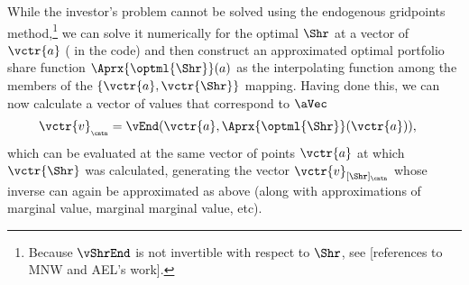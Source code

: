 While the investor's problem cannot be solved using the endogenous gridpoints method,\footnote{Because $\vShrEnd$ is not invertible with respect to $\Shr$, see [references to MNW and AEL's work].} we can solve it numerically for the optimal $\Shr$ at a vector of $\vctr{a}$ ({\aVecCode} in the code)  and then construct an approximated optimal portfolio share function $\Aprx{\optml{\Shr}}(a)$ as the interpolating function among the members of the $\{\vctr{a},\vctr{\Shr}\}$ mapping.  Having done this, we can now calculate a vector of values that correspond to $\aVec$
\begin{equation}\begin{gathered}\begin{aligned}
      \vctr{{v}}_{_\cntn}  & = \vEnd(\vctr{a},\Aprx{\optml{\Shr}}(\vctr{a})), \label{eq:vShrEnd}
    \end{aligned}\end{gathered}\end{equation}
which can be evaluated at the same vector of points $\vctr{a}$ at which $\vctr{\Shr}$ was calculated, generating the vector $\vctr{{v}}_{[\Shr]{_\cntn}}$ whose inverse can again be approximated as above (along with approximations of marginal value, marginal marginal value, etc).%

